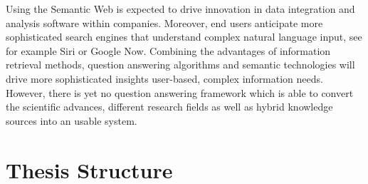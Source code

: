 Using the Semantic Web is expected to drive innovation in data integration and analysis software within companies. 
Moreover, end users anticipate more sophisticated search engines that understand complex natural language input, see for example Siri or Google Now.
Combining the advantages of information retrieval methods, question answering algorithms and semantic technologies will drive more sophisticated insights user-based, complex information needs.
However, there is yet no question answering framework which is able to convert the scientific advances, different research fields as well as hybrid knowledge sources into an usable system.














\section{Thesis Structure}





